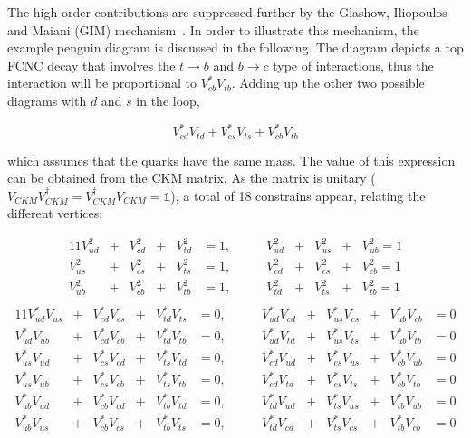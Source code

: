 The high-order contributions are suppressed further by the Glashow, Iliopoulos and Maiani (GIM) mechanism~\cite{PhysRevD.2.1285}. In order to illustrate this mechanism, the example penguin diagram is discussed in the following. The diagram depicts a top FCNC decay that involves the $t\to b$ and $b\to c$ type of interactions, thus the interaction will be proportional to $V_{cb}^*V_{tb}$. Adding up the other two possible diagrams with $d$ and $s$ in the loop, 

\begin{equation}
    V_{cd}^*V_{td}+V_{cs}^*V_{ts}+V_{cb}^*V_{tb}
\end{equation}

which assumes that the quarks have the same mass. The value of this expression can be obtained from the CKM matrix. As the matrix is unitary ($V_{CKM}V_{CKM}^\dagger=V_{CKM}^\dagger V_{CKM}=\mathds{1}$), a total of 18 constrains appear, relating the different vertices: 

\begin{alignat*}{11}
    V_{ud}^2&+&V_{cd}^2&+&V_{td}^2&=1,   &\qquad V_{ud}^2&+&V_{us}^2&+&V_{ub}^2=1  \\
    V_{us}^2&+&V_{cs}^2&+&V_{ts}^2&=1,   &\qquad V_{cd}^2&+&V_{cs}^2&+&V_{cb}^2=1 \\
    V_{ub}^2&+&V_{cb}^2&+&V_{tb}^2&=1,   &\qquad V_{td}^2&+&V_{ts}^2&+&V_{tb}^2=1 \\
\end{alignat*}
\vspace{-1em}
\begin{alignat}{11}
    V_{ud}^*V_{us}&+&V_{cd}^*V_{cs}&+&V_{td}^*V_{ts}&=0,   &\qquad V_{ud}^*V_{cd}&+&V_{us}^*V_{cs}&+&V_{ub}^*V_{cb}&=0 \nonumber \\
    V_{ud}^*V_{ub}&+&V_{cd}^*V_{cb}&+&V_{td}^*V_{tb}&=0,   &\qquad V_{ud}^*V_{td}&+&V_{us}^*V_{ts}&+&V_{ub}^*V_{tb}&=0 \\ 
    V_{us}^*V_{ud}&+&V_{cs}^*V_{cd}&+&V_{ts}^*V_{td}&=0,   &\qquad V_{cd}^*V_{ud}&+&V_{cs}^*V_{us}&+&V_{cb}^*V_{ub}&=0 \nonumber\\
    V_{us}^*V_{ub}&+&V_{cs}^*V_{cb}&+&V_{ts}^*V_{tb}&=0,   &\qquad V_{cd}^*V_{td}&+&V_{cs}^*V_{ts}&+&V_{cb}^*V_{tb}&=0 \nonumber\\
    V_{ub}^*V_{ud}&+&V_{cb}^*V_{cd}&+&V_{tb}^*V_{td}&=0,   &\qquad V_{td}^*V_{ud}&+&V_{ts}^*V_{us}&+&V_{tb}^*V_{ub}&=0 \nonumber\\
    V_{ub}^*V_{us}&+&V_{cb}^*V_{cs}&+&V_{tb}^*V_{ts}&=0,   &\qquad V_{td}^*V_{cd}&+&V_{ts}^*V_{cs}&+&V_{tb}^*V_{cb}&=0 \nonumber
\end{alignat}

